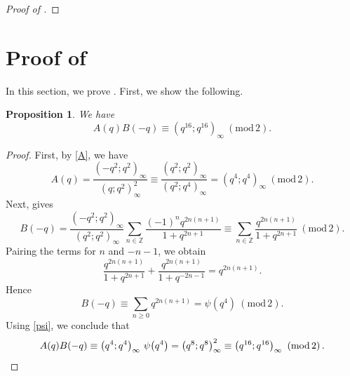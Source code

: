 \documentclass[12pt,reqno]{amsart}
\renewcommand{\(}{\left\(}
\renewcommand{\)}{\right\)}
\newcommand{\os}[2]{\overset{#1}{#2}}
\numberwithin{equation}{section}
\theoremstyle{plain}
\newtheorem{proposition}[theorem]{Proposition}
\theoremstyle{definition}
\numberwithin{equation}{section}
\renewcommand{\pmod}[1]{\ \left( \mathrm{mod} \, #1 \right)}
\begin{document}
\begin{proof}[Proof of ]
\end{proof}


\section{Proof of }\label{sec3b}

In this section, we prove . First, we show the following.

\begin{proposition}\label{newprop}
	We have
	\[
	A(q)B(-q)\equiv (q^{16};q^{16})_\infty \pmod 2.
	\]
\end{proposition}

\begin{proof}
	First, by \eqref{A}, we have
	\[
	A(q)=\frac{(-q^2;q^2)_\infty}{(q;q^2)_\infty^2}
	\equiv \frac{(q^2;q^2)_\infty}{(q^2;q^4)_\infty}
	=(q^4;q^4)_\infty \pmod 2.
	\]
	Next,  gives
	\[
	B(-q)=\frac{(-q^2;q^2)_\infty}{(q^2;q^2)_\infty}
	\sum_{n\in \mathbb{Z}}\frac{(-1)^n q^{2n(n+1)}}{1+q^{2n+1}}
	\equiv
	\sum_{n\in \mathbb{Z}}\frac{q^{2n(n+1)}}{1+q^{2n+1}} \pmod 2.
	\]
	Pairing the terms for $n$ and $-n-1$, we obtain
	\[
	\frac{q^{2n(n+1)}}{1+q^{2n+1}}
	+
	\frac{q^{2n(n+1)}}{1+q^{-2n-1}}
	= q^{2n(n+1)}.
	\]
	Hence
	\[
	B(-q)\equiv \sum_{n\ge 0} q^{2n(n+1)} = \psi(q^4) \pmod 2.
	\]
	Using \eqref{psi}, we conclude that
	\[
	A(q)B(-q)
	\equiv \left(q^4;q^4\right)_\infty\,\psi\!\left(q^4\right)
	= \left(q^8;q^8\right)_\infty^2
	\equiv \left(q^{16};q^{16}\right)_\infty \pmod 2.\qedhere
	\]
\end{proof}
\end{document}
